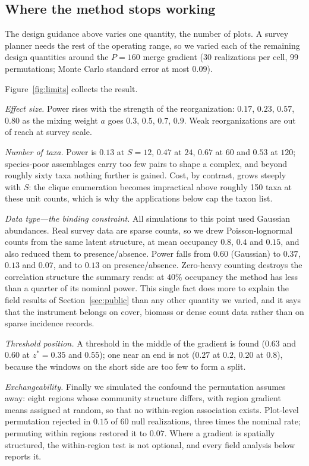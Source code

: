 \documentclass[review,12pt,authoryear]{elsarticle}
\theoremstyle{remark}
\begin{document}
\subsection{Where the method stops working}
\label{sec:limits}

The design guidance above varies one quantity, the number of plots. A
survey planner needs the rest of the operating range, so we varied each of
the remaining design quantities around the $P = 160$ merge gradient (30
realizations per cell, 99 permutations; Monte Carlo standard error at most
$0.09$).

Figure~\ref{fig:limits} collects the result.

\emph{Effect size.} Power rises with the strength of the reorganization:
$0.17$, $0.23$, $0.57$, $0.80$ as the mixing weight $a$ goes $0.3$, $0.5$,
$0.7$, $0.9$. Weak reorganizations are out of reach at survey scale.

\emph{Number of taxa.} Power is $0.13$ at $S = 12$, $0.47$ at $24$, $0.67$
at $60$ and $0.53$ at $120$; species-poor assemblages carry too few pairs
to shape a complex, and beyond roughly sixty taxa nothing further is
gained. Cost, by contrast, grows steeply with $S$: the clique enumeration
becomes impractical above roughly 150 taxa at these unit counts, which is
why the applications below cap the taxon list.

\emph{Data type---the binding constraint.} All simulations to this point
used Gaussian abundances. Real survey data are sparse counts, so we drew
Poisson-lognormal counts from the same latent structure, at mean occupancy
$0.8$, $0.4$ and $0.15$, and also reduced them to presence/absence. Power
falls from $0.60$ (Gaussian) to $0.37$, $0.13$ and $0.07$, and to $0.13$ on
presence/absence. Zero-heavy counting destroys the correlation structure
the summary reads: at $40\%$ occupancy the method has less than a quarter
of its nominal power. This single fact does more to explain the field
results of Section~\ref{sec:public} than any other quantity we varied, and
it says that the instrument belongs on cover, biomass or dense count data
rather than on sparse incidence records.

\emph{Threshold position.} A threshold in the middle of the gradient is
found ($0.63$ and $0.60$ at $z^\ast = 0.35$ and $0.55$); one near an end is
not ($0.27$ at $0.2$, $0.20$ at $0.8$), because the windows on the short
side are too few to form a split.

\emph{Exchangeability.} Finally we simulated the confound the permutation
assumes away: eight regions whose community structure differs, with region
gradient means assigned at random, so that no within-region association
exists. Plot-level permutation rejected in $0.15$ of 60 null realizations,
three times the nominal rate; permuting within regions restored it to
$0.07$. Where a gradient is spatially structured, the within-region test is
not optional, and every field analysis below reports it.
\end{document}

